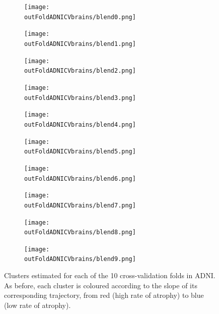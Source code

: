 \begin{figure}[h]
    \centering
    
    \begin{subfigure}[b]{0.19\textwidth}\texttt{[image: \\outFoldADNICVbrains/blend0.png]}\end{subfigure}
    \begin{subfigure}[b]{0.19\textwidth}\texttt{[image: \\outFoldADNICVbrains/blend1.png]}\end{subfigure}
    \begin{subfigure}[b]{0.19\textwidth}\texttt{[image: \\outFoldADNICVbrains/blend2.png]}\end{subfigure}
    \begin{subfigure}[b]{0.19\textwidth}\texttt{[image: \\outFoldADNICVbrains/blend3.png]}\end{subfigure}
    \begin{subfigure}[b]{0.19\textwidth}\texttt{[image: \\outFoldADNICVbrains/blend4.png]}\end{subfigure}
    \begin{subfigure}[b]{0.19\textwidth}\texttt{[image: \\outFoldADNICVbrains/blend5.png]}\end{subfigure}
    \begin{subfigure}[b]{0.19\textwidth}\texttt{[image: \\outFoldADNICVbrains/blend6.png]}\end{subfigure}
    \begin{subfigure}[b]{0.19\textwidth}\texttt{[image: \\outFoldADNICVbrains/blend7.png]}\end{subfigure}
    \begin{subfigure}[b]{0.19\textwidth}\texttt{[image: \\outFoldADNICVbrains/blend8.png]}\end{subfigure}
    \begin{subfigure}[b]{0.19\textwidth}\texttt{[image: \\outFoldADNICVbrains/blend9.png]}\end{subfigure}
    
    \caption{Clusters estimated for each of the 10 cross-validation folds in ADNI. As before, each cluster is coloured according to the slope of its corresponding trajectory, from red (high rate of atrophy) to blue (low rate of atrophy).}
    \label{fig:ADNICVbrains}
\end{figure}


